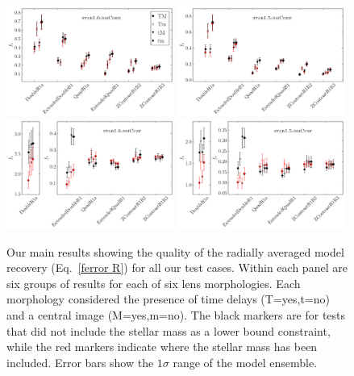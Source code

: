 \documentclass[galley,usenatbib]{mn2e}
\newcommand{\eqnrefp}[1] {(Eq.~\ref{#1})}
\begin{document}
\begin{figure}
\includegraphics[width=0.49\textwidth]{AAferror_profile-1sig.pdf}
\includegraphics[width=0.49\textwidth]{BBferror_profile-1sig.pdf}\\
\includegraphics[width=0.49\textwidth]{ACferror_profile-1sig.pdf}
\includegraphics[width=0.49\textwidth]{BCferror_profile-1sig.pdf}
\caption{Our main results showing the quality of the radially averaged model recovery \eqnrefp{ferror R} for all our test cases. 
Within each panel are six groups of results for each of six lens morphologies. Each morphology
considered the presence of time delays (T=yes,t=no) and a central image (M=yes,m=no). The black markers are for tests
that did not include the stellar mass as a lower bound constraint, while the red markers
indicate where the stellar mass has been included. Error bars show the $1\sigma$ range of the model ensemble.}
\label{main results}
\end{figure}
\end{document}
